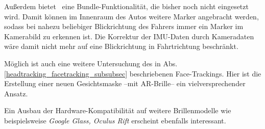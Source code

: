 Außerdem bietet \alvar \ eine Bundle-Funktionalität, die bisher noch nicht eingesetzt wird.
Damit können im Innenraum des Autos weitere Marker angebracht werden, sodass bei nahezu beliebiger Blickrichtung des Fahrers immer ein Marker im Kamerabild zu erkennen ist.
Die Korrektur der \ac{IMU}-Daten durch Kameradaten wäre damit nicht mehr auf eine Blickrichtung in Fahrtrichtung beschränkt.

Möglich ist auch eine weitere Untersuchung des in Abs. \ref{headtracking_facetracking_subsubsec} beschriebenen Face-Trackings.
Hier ist die Erstellung einer neuen Gesichtsmaske --mit \ac{AR}-Brille-- ein vielversprechender Ansatz.

Ein Ausbau der Hardware-Kompatibilität auf weitere Brillenmodelle wie beispielsweise \emph{Google Glass, Oculus Rift} \oae erscheint ebenfalls interessant.


